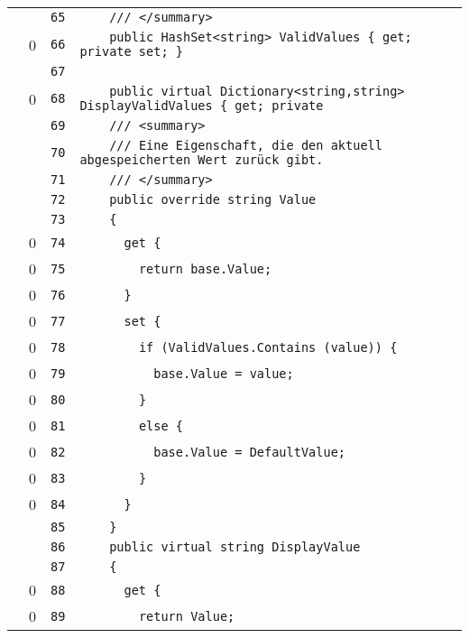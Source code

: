 \documentclass[a4paper,10pt]{article}
\begin{document}
\begin{longtable}[l]{lrrl}
\cellcolor{gray} &  & \verb~65~ & \verb~    /// </summary>~\\
\cellcolor{red} & 0 & \verb~66~ & \verb~    public HashSet<string> ValidValues { get; private set; }~\\
\cellcolor{gray} &  & \verb~67~ & \verb~~\\
\cellcolor{red} & 0 & \verb~68~ & \verb~    public virtual Dictionary<string,string> DisplayValidValues { get; private~\\
\cellcolor{gray} &  & \verb~69~ & \verb~    /// <summary>~\\
\cellcolor{gray} &  & \verb~70~ & \verb~    /// Eine Eigenschaft, die den aktuell abgespeicherten Wert zurück gibt.~\\
\cellcolor{gray} &  & \verb~71~ & \verb~    /// </summary>~\\
\cellcolor{gray} &  & \verb~72~ & \verb~    public override string Value~\\
\cellcolor{gray} &  & \verb~73~ & \verb~    {~\\
\cellcolor{red} & 0 & \verb~74~ & \verb~      get {~\\
\cellcolor{red} & 0 & \verb~75~ & \verb~        return base.Value;~\\
\cellcolor{red} & 0 & \verb~76~ & \verb~      }~\\
\cellcolor{red} & 0 & \verb~77~ & \verb~      set {~\\
\cellcolor{red} & 0 & \verb~78~ & \verb~        if (ValidValues.Contains (value)) {~\\
\cellcolor{red} & 0 & \verb~79~ & \verb~          base.Value = value;~\\
\cellcolor{red} & 0 & \verb~80~ & \verb~        }~\\
\cellcolor{red} & 0 & \verb~81~ & \verb~        else {~\\
\cellcolor{red} & 0 & \verb~82~ & \verb~          base.Value = DefaultValue;~\\
\cellcolor{red} & 0 & \verb~83~ & \verb~        }~\\
\cellcolor{red} & 0 & \verb~84~ & \verb~      }~\\
\cellcolor{gray} &  & \verb~85~ & \verb~    }~\\
\cellcolor{gray} &  & \verb~86~ & \verb~    public virtual string DisplayValue~\\
\cellcolor{gray} &  & \verb~87~ & \verb~    {~\\
\cellcolor{red} & 0 & \verb~88~ & \verb~      get {~\\
\cellcolor{red} & 0 & \verb~89~ & \verb~        return Value;~\\

\end{longtable}
\end{document}
